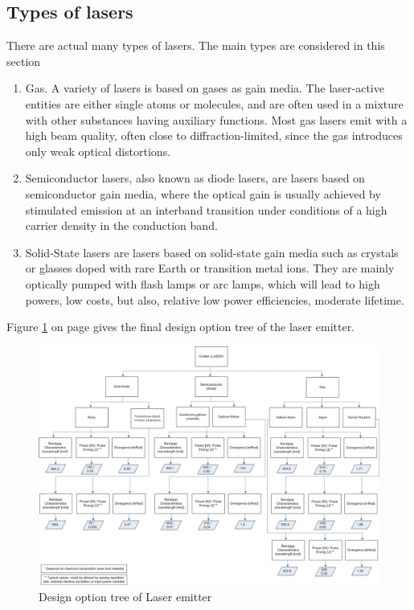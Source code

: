\subsection{Types of lasers}\cite{lasertech}
	\label{blDOLSRtypes}
There are actual many types of \acs{laser}s. The main types are considered in this section
\begin{enumerate}
	\item Gas. A variety of \acs{laser}s is based on gases as gain media. The \acs{laser}-active entities are either single atoms or molecules, and are often used in a mixture with other substances having auxiliary functions. Most gas lasers emit with a high beam quality, often close to diffraction-limited, since the gas introduces only weak optical distortions.
	\item Semiconductor \acs{laser}s, also known as diode \acs{laser}s, are \acs{laser}s based on semiconductor gain media, where the optical gain is usually achieved by stimulated emission at an interband transition under conditions of a high carrier density in the conduction band.  
	\item Solid-State \acs{laser}s are \acs{laser}s based on solid-state gain media such as crystals or glasses doped with rare Earth or transition metal ions. They are mainly optically pumped with flash lamps or arc lamps, which will lead to high powers, low costs, but also, relative low power efficiencies, moderate lifetime.
\end{enumerate} 
Figure \ref{DOS_laser} on page \pageref{DOS_laser} gives the final design option tree of the laser emitter.

\begin{figure} [h]
	\begin{center} \includegraphics[width=1\textwidth,angle=90]{chapters/img/DOStree_laser.jpg}	
	\caption{Design option tree of Laser emitter}
	\label{DOS_laser}
	\end{center}
\end{figure}